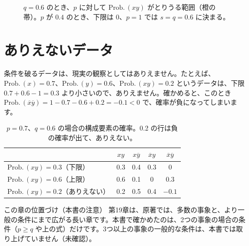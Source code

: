 \documentclass[a4paper,11pt,openany]{ltjsbook}
\newcommand{\nx}[1]{\overline{#1}}
\newcommand{\Prob}{\mathrm{Prob.}\,}
\begin{document}
\begin{figure}[htbp]
\centering
{}
\caption{$q=0.6$ のとき、$p$ に対して $\Prob(xy)$ がとりうる範囲（橙の帯）。$p$ が $0.4$ のとき、下限は $0$、$p=1$ では $s=q=0.6$ に決まる。}
\end{figure}

\section{ありえないデータ}

条件を破るデータは、現実の観察としてはありえません。たとえば、$\Prob(x)=0.7$、$\Prob(y)=0.6$、$\Prob(xy)=0.2$ というデータは、下限 $0.7+0.6-1=0.3$ より小さいので、ありえません。確かめると、このとき $\Prob(\nx x\nx y)=1-0.7-0.6+0.2=-0.1<0$ で、確率が負になってしまいます。

\begin{table}[htbp]
\centering
\begin{tabular}{lcccc}
\toprule
 & $xy$ & $x\nx y$ & $\nx xy$ & $\nx x\nx y$\\
\midrule
$\Prob(xy)=0.3$（下限） & 0.3 & 0.4 & 0.3 & 0\\
$\Prob(xy)=0.6$（上限） & 0.6 & 0.1 & 0 & 0.3\\
$\Prob(xy)=0.2$（ありえない） & 0.2 & 0.5 & 0.4 & $-0.1$\\
\bottomrule
\end{tabular}
\caption{$p=0.7$、$q=0.6$ の場合の構成要素の確率。0.2 の行は負の確率が出て、ありえない。}
\end{table}

\begin{notebox}{この章の位置づけ（本書の注意）}
第19章は、原著では、多数の事象と、より一般の条件にまで広がる長い章です。本書で確かめたのは、2つの事象の場合の条件（$p\ge q$ や上の式）だけです。3つ以上の事象の一般的な条件は、本書では取り上げていません（未確認）。
\end{notebox}
\end{document}
